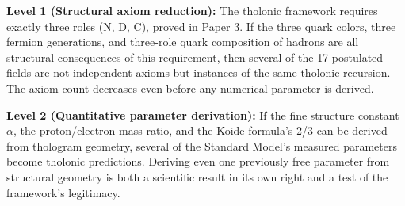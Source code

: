 \documentclass[
  11pt,
  letterpaper,
]{article}
\begin{document}
\textbf{Level 1 (Structural axiom reduction):} The tholonic framework
requires exactly three roles (N, D, C), proved in
\href{https://github.com/baardev/truevalue/blob/main/docnav/Research/papers/3_minimal-recursive-triadic-framework/3_minimal-recursive-triadic-framework.pdf}{Paper
3}. If the three quark colors, three fermion generations, and three-role
quark composition of hadrons are all structural consequences of this
requirement, then several of the 17 postulated fields are not
independent axioms but instances of the same tholonic recursion. The
axiom count decreases even before any numerical parameter is derived.

\textbf{Level 2 (Quantitative parameter derivation):} If the fine
structure constant \(\alpha\), the proton/electron mass ratio, and the
Koide formula's 2/3 can be derived from thologram geometry, several of
the Standard Model's measured parameters become tholonic predictions.
Deriving even one previously free parameter from structural geometry is
both a scientific result in its own right and a test of the framework's
legitimacy.
\end{document}
